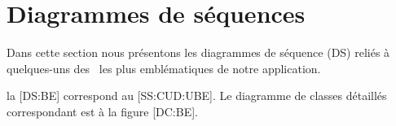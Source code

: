 \chapter{Diagrammes de séquences}

Dans cette section nous présentons les diagrammes de séquence (DS) reliés à quelques-uns des \cu\ les plus emblématiques de notre application.

\startitemize
\item la [DS:BE] correspond au \in{\cu}[SS:CUD:UBE].
Le diagramme de classes détaillés correspondant est à la figure [DC:BE].
\stopitemize


